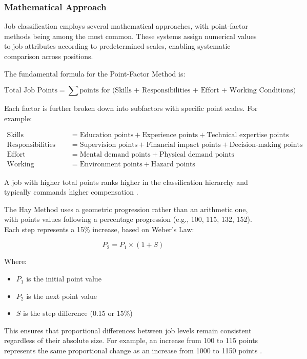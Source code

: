 \documentclass[../main.tex]{subfiles}
\begin{document}
\subsubsection{Mathematical Approach}

Job classification employs several mathematical approaches, with point-factor methods being among the most common. These systems assign numerical values to job attributes according to predetermined scales, enabling systematic comparison across positions.

The fundamental formula for the Point-Factor Method is:

\[
\text{Total Job Points} = \sum \text{points for (Skills + Responsibilities + Effort + Working Conditions)}
\]

Each factor is further broken down into subfactors with specific point scales. For example:

\begin{align}
\text{Skills} &= \text{Education points} + \text{Experience points} + \text{Technical expertise points} \\
\text{Responsibilities} &= \text{Supervision points} + \text{Financial impact points} + \text{Decision-making points} \\
\text{Effort} &= \text{Mental demand points} + \text{Physical demand points} \\
\text{Working Conditions} &= \text{Environment points} + \text{Hazard points}
\end{align}

A job with higher total points ranks higher in the classification hierarchy and typically commands higher compensation \cite{synergogy2024}.

The Hay Method uses a geometric progression rather than an arithmetic one, with points values following a percentage progression (e.g., 100, 115, 132, 152). Each step represents a 15\% increase, based on Weber's Law:

\[
P_2 = P_1 \times (1 + S)
\]

Where:
\begin{itemize}
\item \(P_1\) is the initial point value
\item \(P_2\) is the next point value
\item \(S\) is the step difference (0.15 or 15\%)
\end{itemize}

This ensures that proportional differences between job levels remain consistent regardless of their absolute size. For example, an increase from 100 to 115 points represents the same proportional change as an increase from 1000 to 1150 points \cite{haygroup2024}.
\end{document}
